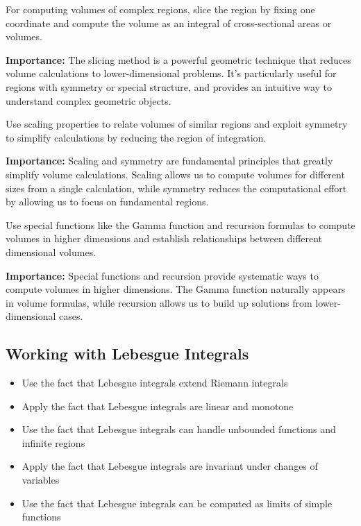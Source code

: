 \begin{theorem}
For computing volumes of complex regions, slice the region by fixing one coordinate and compute the volume as an integral of cross-sectional areas or volumes.
\end{theorem}

\noindent\textbf{Importance:} The slicing method is a powerful geometric technique that reduces volume calculations to lower-dimensional problems. It's particularly useful for regions with symmetry or special structure, and provides an intuitive way to understand complex geometric objects.



\begin{theorem}
Use scaling properties to relate volumes of similar regions and exploit symmetry to simplify calculations by reducing the region of integration.
\end{theorem}

\noindent\textbf{Importance:} Scaling and symmetry are fundamental principles that greatly simplify volume calculations. Scaling allows us to compute volumes for different sizes from a single calculation, while symmetry reduces the computational effort by allowing us to focus on fundamental regions.



\begin{theorem}
Use special functions like the Gamma function and recursion formulas to compute volumes in higher dimensions and establish relationships between different dimensional volumes.
\end{theorem}

\noindent\textbf{Importance:} Special functions and recursion provide systematic ways to compute volumes in higher dimensions. The Gamma function naturally appears in volume formulas, while recursion allows us to build up solutions from lower-dimensional cases.



\subsection*{Working with Lebesgue Integrals}
\begin{itemize}
\item Use the fact that Lebesgue integrals extend Riemann integrals
\item Apply the fact that Lebesgue integrals are linear and monotone
\item Use the fact that Lebesgue integrals can handle unbounded functions and infinite regions
\item Apply the fact that Lebesgue integrals are invariant under changes of variables
\item Use the fact that Lebesgue integrals can be computed as limits of simple functions
\end{itemize}

